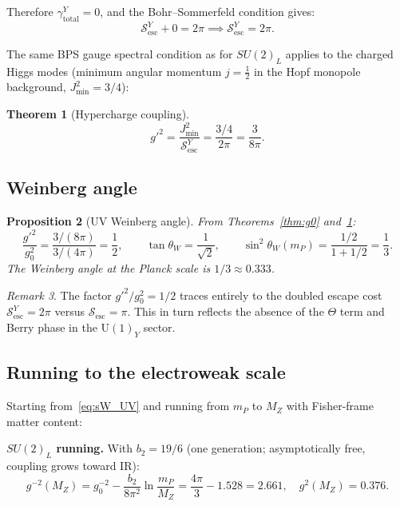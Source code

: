 \documentclass[12pt]{article}
\newtheorem{theorem}{Theorem}[section]
\newtheorem{proposition}[theorem]{Proposition}
\theoremstyle{definition}
\theoremstyle{remark}
\newtheorem{remark}[theorem]{Remark}
\begin{document}
Therefore $\gamma_{\mathrm{total}}^Y=0$, and the Bohr--Sommerfeld condition gives:
\begin{equation}
\mathcal{S}_{\mathrm{esc}}^Y+0=2\pi\implies\mathcal{S}_{\mathrm{esc}}^Y=2\pi.
\end{equation}

The same BPS gauge spectral condition as for $SU(2)_L$ applies to the charged
Higgs modes (minimum angular momentum $j=\tfrac{1}{2}$ in the Hopf monopole
background, $J^2_{\min}=3/4$):

\begin{theorem}[Hypercharge coupling]
\label{thm:gprime}
\begin{equation}
\boxed{g'^2=\frac{J^2_{\min}}{\mathcal{S}_{\mathrm{esc}}^Y}=\frac{3/4}{2\pi}=\frac{3}{8\pi}.}
\end{equation}
\end{theorem}

\subsection{Weinberg angle}

\begin{proposition}[UV Weinberg angle]
\label{prop:theta_W}
From Theorems~\ref{thm:g0} and~\ref{thm:gprime}:
\begin{equation}
\frac{g'^2}{g_0^2}=\frac{3/(8\pi)}{3/(4\pi)}=\frac{1}{2},\qquad
\tan\theta_W=\frac{1}{\sqrt{2}},\qquad
\sin^2\theta_W(m_P)=\frac{1/2}{1+1/2}=\frac{1}{3}.
\label{eq:sW_UV}
\end{equation}
The Weinberg angle at the Planck scale is $1/3\approx 0.333$.
\end{proposition}

\begin{remark}
The factor $g'^2/g_0^2=1/2$ traces entirely to the doubled escape cost
$\mathcal{S}_{\mathrm{esc}}^Y=2\pi$ versus $\mathcal{S}_{\mathrm{esc}}=\pi$.
This in turn reflects the absence of the $\Theta$ term and Berry phase in the
$\mathrm{U}(1)_Y$ sector.
\end{remark}

\subsection{Running to the electroweak scale}

Starting from~\eqref{eq:sW_UV} and running from $m_P$ to $M_Z$ with
Fisher-frame matter content:

\medskip
\noindent\textbf{$SU(2)_L$ running.}  With $b_2=19/6$ (one generation;
asymptotically free, coupling grows toward IR):
\begin{equation}
g^{-2}(M_Z)=g_0^{-2}-\frac{b_2}{8\pi^2}\ln\frac{m_P}{M_Z}
=\frac{4\pi}{3}-1.528=2.661,\quad g^2(M_Z)=0.376.
\end{equation}
\end{document}
